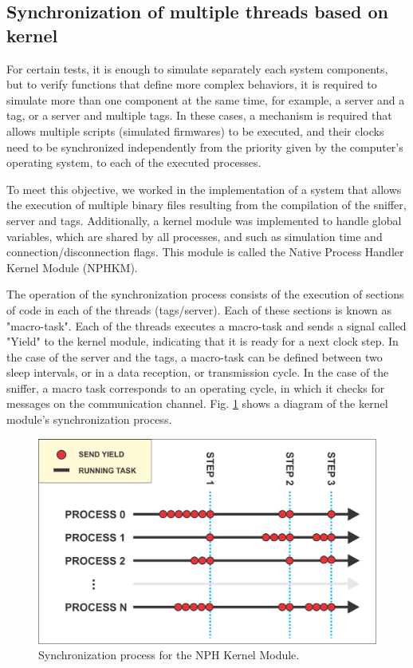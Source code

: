 \documentclass[journal]{IEEEtran}	%
\begin{document}
\subsection{Synchronization of multiple threads based on kernel}


For certain tests, it is enough to simulate separately each system components, but to verify functions that define more complex behaviors, it is required to simulate more than one component at the same time, for example, a server and a tag, or a server and multiple tags. In these cases, a mechanism is required that allows multiple scripts (simulated firmwares) to be executed, and their clocks need to be synchronized independently from the priority given by the computer's operating system, to each of the executed processes.

To meet this objective, we worked in the implementation of a system that allows the execution of multiple binary files resulting from the compilation of the sniffer, server and tags. Additionally, a kernel module was implemented to handle global variables, which are shared by all processes, and such as simulation time and connection/disconnection flags. This module is called the Native Process Handler Kernel Module (NPHKM).

The operation of the synchronization process consists of the execution of sections of code in each of the threads (tags/server). Each of these sections is known as "macro-task". Each of the threads executes a macro-task and sends a signal called "Yield" to the kernel module, indicating that it is ready for a next clock step. In the case of the server and the tags, a macro-task can be defined between two sleep intervals, or in a data reception, or transmission cycle. In the case of the sniffer, a macro task corresponds to an operating cycle, in which it checks for messages on the communication channel. Fig. \ref{fig:nph_kernel} shows a diagram of the kernel module's synchronization process.

\begin{figure}[t!]
\centering
\includegraphics[width=0.9\columnwidth]{KERNEL_SYNC.png}
\caption{Synchronization process for the NPH Kernel Module.}
\label{fig:nph_kernel}
\end{figure}
\end{document}
